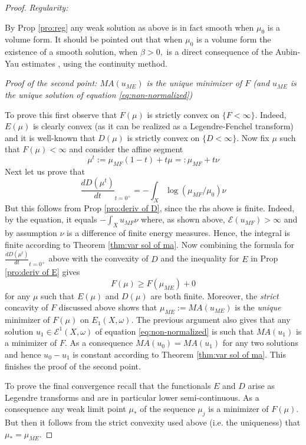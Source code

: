 \documentclass[11pt,oneside,english]{amsart}
\numberwithin{equation}{section}
\numberwithin{figure}{section}
\theoremstyle{plain}
\theoremstyle{plain}
\theoremstyle{plain}
\theoremstyle{plain}
\theoremstyle{remark}
\theoremstyle{definition}
\begin{document}
\begin{proof}
\emph{Regularity:}

By Prop \ref{pro:reg} any weak solution as above is in fact smooth
when $\mu_{0}$ is a volume form. It should be pointed out that when
$\mu_{0}$ is a volume form the existence of a smooth solution, when
$\beta>0,$ is a direct consequence of the Aubin-Yau estimates \cite{au,y},
using the continuity method.

\emph{Proof of the second point: $MA(u_{ME})$ is the unique minimizer
of $F$ (and $u_{ME}$ is the unique solution of equation \ref{eq:non-normalized})}

To prove this first observe that $F(\mu)$ is strictly convex on $\{F<\infty\}.$
Indeed, $E(\mu)$ is clearly convex (as it can be realized as a Legendre-Fenchel
transform) and it is well-known \cite{de-ze} that $D(\mu)$ is strictly
convex on $\{D<\infty\}.$ Now fix $\mu$ such that $F(\mu)<\infty$
and consider the affine segment 
\[
\mu^{t}:=\mu_{MF}(1-t)+t\mu=:\mu_{MF}+t\nu
\]
 Next let us prove that 
\[
\frac{dD(\mu^{t})}{dt}_{t=0^{+}}=-\int_{X}\log(\mu_{MF}/\mu_{0})\nu
\]
 But this follows from Prop \ref{pro:deriv of D}, since the rhs above
is finite. Indeed, by the  equation, it equals $-\int_{X}u_{MF}\nu$
where, as shown above, $\mathcal{E}(u_{MF})>\infty$ and by assumption
$\nu$ is a difference of finite energy measures. Hence, the integral
is finite according to Theorem \ref{thm:var sol of ma}. Now combining
the formula for $\frac{dD(\mu^{t})}{dt}_{t=0^{+}}$ above with the
convexity of $D$ and the inequality for $E$ in Prop \ref{pro:deriv of E}
gives 
\[
F(\mu)\geq F(\mu_{ME})+0
\]
 for any $\mu$ such that $E(\mu)$ and $D(\mu)$ are both finite.
Moreover, the \emph{strict} concavity of $F$ discussed above shows
that $\mu_{ME}:=MA(u_{ME})$ is the \emph{unique} minimizer of $F(\mu)$
on $E_{1}(X,\omega).$ The previous argument also gives that any solution
$u_{1}\in\mathcal{E}^{1}(X,\omega)$ of equation \ref{eq:non-normalized}
is such that $MA(u_{1})$ is a minimizer of $F.$ As a consequence
$MA(u_{0})=MA(u_{1})$ for any two solutions and hence $u_{0}-u_{1}$
is constant according to Theorem \ref{thm:var sol of ma}. This finishes
the proof of the second point.

To prove the final convergence recall that the functionals $E$ and
$D$ arise as Legendre transforms and are in particular lower semi-continuous.
As a consequence any weak limit point $\mu_{*}$ of the sequence $\mu_{j}$
is a minimizer of $F(\mu).$ But then it follows from the strict convexity
used above (i.e. the uniqueness) that $\mu_{*}=\mu_{ME}.$ 
\end{proof}
\end{document}
